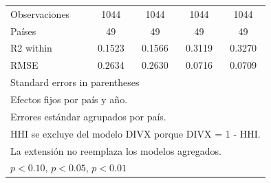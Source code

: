 \begin{table}[htbp]
\begin{tabular}{l*{4}{c}}
\midrule
Observaciones       &        1044         &        1044         &        1044         &        1044         \\
Países              &          49         &          49         &          49         &          49         \\
R2 within           &      0.1523         &      0.1566         &      0.3119         &      0.3270         \\
RMSE                &      0.2634         &      0.2630         &      0.0716         &      0.0709         \\
\bottomrule
\multicolumn{5}{l}{\footnotesize Standard errors in parentheses}\\
\multicolumn{5}{l}{\footnotesize Efectos fijos por país y año.}\\
\multicolumn{5}{l}{\footnotesize Errores estándar agrupados por país.}\\
\multicolumn{5}{l}{\footnotesize HHI se excluye del modelo DIVX porque DIVX = 1 - HHI.}\\
\multicolumn{5}{l}{\footnotesize La extensión no reemplaza los modelos agregados.}\\
\multicolumn{5}{l}{\footnotesize \sym{*} \(p<0.10\), \sym{**} \(p<0.05\), \sym{***} \(p<0.01\)}\\
\end{tabular}
\end{table}

